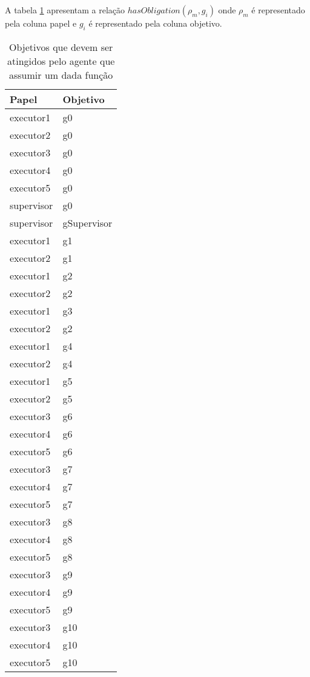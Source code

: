 A tabela \ref{deontic1}  apresentam a relação $hasObligation(\rho_m,g_i)$ onde $\rho_m$ é representado pela coluna papel e $g_i$ é representado pela coluna objetivo. 


\begin{center}
\begin{longtable}[H]{|l|l|}
\caption{Objetivos que devem ser atingidos pelo agente que assumir um dada função} \label{deontic1}
\\
\hline
\textbf{Papel} & \textbf{Objetivo} \\ \hline
executor1 & g0 \\ \hline
executor2 & g0 \\ \hline
executor3 & g0 \\ \hline
executor4 & g0 \\ \hline
executor5 & g0 \\ \hline
supervisor & g0 \\ \hline
supervisor & gSupervisor \\ \hline
executor1 & g1 \\ \hline
executor2 & g1 \\ \hline
executor1 & g2 \\ \hline
executor2 & g2 \\ \hline
executor1 & g3 \\ \hline
executor2 & g2 \\ \hline
executor1 & g4 \\ \hline
executor2 & g4 \\ \hline
executor1 & g5 \\ \hline
executor2 & g5 \\ \hline
executor3 & g6 \\ \hline
executor4 & g6 \\ \hline
executor5 & g6 \\ \hline
executor3 & g7 \\ \hline
executor4 & g7 \\ \hline
executor5 & g7 \\ \hline
executor3 & g8 \\ \hline
executor4 & g8 \\ \hline
executor5 & g8 \\ \hline
executor3 & g9 \\ \hline
executor4 & g9 \\ \hline
executor5 & g9 \\ \hline
executor3 & g10 \\ \hline
executor4 & g10 \\ \hline
executor5 & g10 \\ \hline

\end{longtable}
\end{center}
